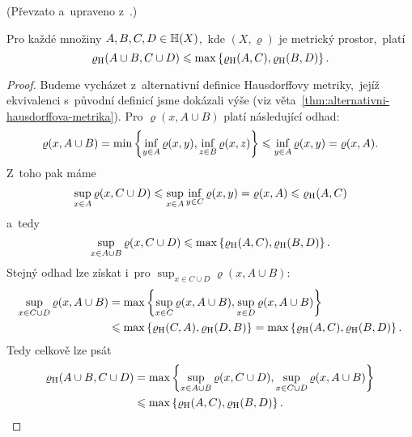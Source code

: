 (Převzato a~upraveno z~\citep[str. 79]{Barnsley1993}.)
\begin{lemma}\label{lem:hausdorffova-metrika-odhad-sjednoceni}
    Pro každé množiny $A,B,C,D\in\mathbb{H}(X)$,~kde $(X,\varrho)$ je metrický prostor,~platí
    \[\varrho_\textup{H}(A\cup B,C\cup D)\leqslant\max\left\{\varrho_\textup{H}(A,C),\varrho_\textup{H}(B,D)\right\}.\]
\end{lemma}
\begin{proof}
    Budeme vycházet z~alternativní definice Hausdorffovy metriky,~jejíž ekvivalenci s~původní definicí jsme dokázali výše (viz věta~\ref{thm:alternativni-hausdorffova-metrika}). Pro $\varrho(x,A\cup B)$ platí následující odhad:
    \[\varrho(x,A\cup B)=\min\left\{\inf_{y\in A}\varrho(x,y),\inf_{z\in B}\varrho(x,z)\right\}\leqslant\inf_{y\in A}\varrho(x,y)=\varrho(x,A).\]
    Z~toho pak máme
    \[\sup_{x\in A}\varrho(x,C\cup D)\leqslant\sup_{x\in A}\inf_{y\in C}\varrho(x,y)=\varrho(x,A)\leqslant\varrho_\textup{H}(A,C)\]
    a~tedy
    \[\sup_{x\in A\cup B}\varrho(x,C\cup D)\leqslant\max\left\{\varrho_\textup{H}(A,C),\varrho_\textup{H}(B,D)\right\}.\]
    Stejný odhad lze získat i~pro $\sup_{x\in C\cup D}\varrho(x,A\cup B)$:
    \begin{align*}
        \sup_{x\in C\cup D}\varrho(x,A\cup B)&=\max\left\{\sup_{x\in C}\varrho(x,A\cup B),\sup_{x\in D}\varrho(x,A\cup B)\right\}\\
        &\leqslant\max\left\{\varrho_\textup{H}(C,A),\varrho_\textup{H}(D,B)\right\}=\max\left\{\varrho_\textup{H}(A,C),\varrho_\textup{H}(B,D)\right\}.
    \end{align*}
    Tedy celkově lze psát
    \begin{align*}
        \varrho_\textup{H}(A\cup B,C\cup D)&=\max\left\{\sup_{x\in A\cup B}\varrho(x,C\cup D),\sup_{x\in C\cup D}\varrho(x,A\cup B)\right\}\\
        &\leqslant\max\left\{\varrho_\textup{H}(A,C),\varrho_\textup{H}(B,D)\right\}.
    \end{align*}
\end{proof}

